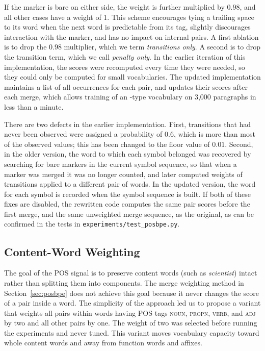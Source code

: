 If the marker is bare on either side, the weight is further multiplied by $0.98$, and all other cases have a weight of 1.
This scheme encourages tying a trailing space to its word when the next word is predictable from its tag, slightly discourages interaction with the marker, and has no impact on internal pairs.
A first ablation is to drop the $0.98$ multiplier, which we term \emph{transitions only}.
A second is to drop the transition term, which we call \emph{penalty only}.
In the earlier iteration of this implementation, the scores were recomputed every time they were needed, so they could only be computed for small vocabularies.
The updated implementation maintains a list of all occurrences for each pair, and updates their scores after each merge, which allows training of an \nVocabBudget-type vocabulary on 3,000 paragraphs in less than a minute.

There are two defects in the earlier implementation.
First, transitions that had never been observed were assigned a probability of $0.6$, which is more than most of the observed values; this has been changed to the floor value of $0.01$.
Second, in the older version, the word to which each symbol belonged was recovered by searching for bare markers in the current symbol sequence, so that when a marker was merged it was no longer counted, and later computed weights of transitions applied to a different pair of words.
In the updated version, the word for each symbol is recorded when the symbol sequence is built.
If both of these fixes are disabled, the rewritten code computes the same pair scores before the first merge, and the same unweighted merge sequence, as the original, as can be confirmed in the tests in \texttt{experiments/test\_posbpe.py}.

\subsection{Content-Word Weighting}\label{sec:content}
The goal of the POS signal is to preserve content words (such as \emph{scientist}) intact rather than splitting them into components.
The merge weighting method in Section~\ref{sec:posbpe} does not achieve this goal because it never changes the score of a pair inside a word.
The simplicity of the approach led us to propose a variant that weights all pairs within words having POS tags \textsc{noun}, \textsc{propn}, \textsc{verb}, and \textsc{adj} by two and all other pairs by one.
The weight of two was selected before running the experiments and never tuned.
This variant moves vocabulary capacity toward whole content words and away from function words and affixes.

